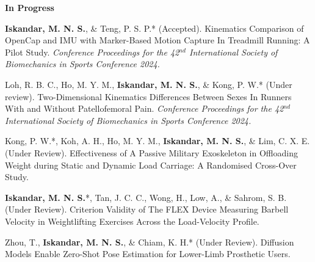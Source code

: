 \documentclass[../main.tex]{subfiles}
\begin{document}
        \textbf{In Progress}
        \def\labelprefix{P}
        \begin{etaremune}
            \item\label{conference: isbs2024opencap} {\textbf{Iskandar, M. N. S.}, \& Teng, P. S. P.* (Accepted). Kinematics Comparison of OpenCap and IMU with Marker-Based Motion Capture In Treadmill Running: A Pilot Study. \textit{Conference Proceedings for the 42$^{nd}$ International Society of Biomechanics in Sports Conference 2024.}}
            
            \item\label{conference: isbs2024raystudy} Loh, R. B. C., Ho, M. Y. M., {\textbf{Iskandar, M. N. S.}, \& Kong, P. W.* (Under review). Two-Dimensional Kinematics Differences Between Sexes In Runners With and Without Patellofemoral Pain. \textit{Conference Proceedings for the 42$^{nd}$ International Society of Biomechanics in Sports Conference 2024.}}

            \item\label{article: spm exoskeleton}{Kong, P. W.*, Koh, A. H., Ho, M. Y. M., \textbf{Iskandar, M. N. S.}, \& Lim, C. X. E. (Under Review). Effectiveness of A Passive Military Exoskeleton in Offloading Weight during Static and Dynamic Load Carriage: A Randomised Cross-Over Study.}
            
            \item\label{article: fyp}{\textbf{Iskandar, M. N. S.}*, Tan, J. C. C., Wong, H., Low, A., \& Sahrom, S. B. (Under Review). Criterion Validity of The FLEX Device Measuring Barbell Velocity in Weightlifting Exercises Across the Load-Velocity Profile.}
            
            \item\label{article: diffusion_openpose}{Zhou, T., \textbf{Iskandar, M. N. S.}, \& Chiam, K. H.* (Under Review). Diffusion Models Enable Zero-Shot Pose Estimation for Lower-Limb Prosthetic Users. \href{https://arxiv.org/abs/2312.07854}{\faFilePdfO}}
        \end{etaremune}
        
  \resumeSubHeadingListEnd
\end{document}

